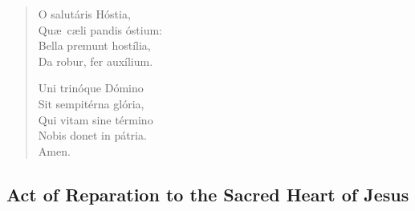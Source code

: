 \documentclass[statementpaper, 11pt]{memoir}
\begin{document}
\maketitle


\begin{verse}

O salut\'aris H\'ostia,\\
Qu\ae\ c\ae li pandis \'ostium:\\
Bella premunt host\'ilia,\\
Da robur, fer aux\'ilium.

Uni trin\'oque D\'omino\\
Sit sempit\'erna gl\'oria,\\
Qui vitam sine t\'ermino\\
Nobis donet in p\'atria.\\
Amen.
    
\end{verse}

\subsection{Act of Reparation to the Sacred Heart of Jesus}
\end{document}

